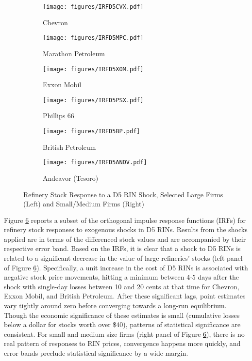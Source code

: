 \documentclass[11pt]{article}
\begin{document}
\begin{figure}[!htpb]
	\centering
	\begin{subfigure}{.5\textwidth}
		\centering
		\texttt{[image: figures/IRFD5CVX.pdf]}
		\caption{Chevron}
		\label{fig:sub1}
	\end{subfigure}%
	\begin{subfigure}{.5\textwidth}
		\centering
		\texttt{[image: figures/IRFD5MPC.pdf]}
		\caption{Marathon Petroleum}
		\label{fig:sub2}
	\end{subfigure}
	\begin{subfigure}{.5\textwidth}
		\centering
		\texttt{[image: figures/IRFD5XOM.pdf]}
		\caption{Exxon Mobil}
	\end{subfigure}%
	\begin{subfigure}{.5\textwidth}
		\centering
		\texttt{[image: figures/IRFD5PSX.pdf]}
		\caption{Phillips 66}
		\label{fig:sub2}
	\end{subfigure}
	\begin{subfigure}{.5\textwidth}
		\centering
		\texttt{[image: figures/IRFD5BP.pdf]}
		\caption{British Petroleum}
		\label{fig:sub1}
	\end{subfigure}%
	\begin{subfigure}{.5\textwidth}
		\centering
		\texttt{[image: figures/IRFD5ANDV.pdf]}
		\caption{Andeavor (Tesoro)}
		\label{fig:sub2}
	\end{subfigure}
	\caption{Refinery Stock Response to a D5 RIN Shock, Selected Large Firms (Left) and Small/Medium Firms (Right)}
	\label{fig:test}
\end{figure}

Figure \ref{fig:test} reports a subset of the orthogonal impulse response functions (IRFs) for refinery stock responses to exogenous shocks in D5 RINs. Results from the shocks applied are in terms of the differenced stock values and are accompanied by their respective error band. Based on the IRFs, it is clear that a shock to D5 RINs is related to a significant decrease in the value of large refineries' stocks (left panel of Figure \ref{fig:test}). Specifically, a unit increase in the cost of D5 RINs is associated with negative stock price movements, hitting a minimum between 4-5 days after the shock with single-day losses between 10 and 20 cents at that time for Chevron, Exxon Mobil, and British Petroleum. After these significant lags, point estimates vary tightly around zero before converging towards a long-run equilibrium. Though the economic significance of these estimates is small (cumulative losses below a dollar for stocks worth over \$40), patterns of statistical significance are consistent. For small and medium size firms (right panel of Figure \ref{fig:test}), there is no real pattern of responses to RIN prices, convergence happens more quickly, and error bands preclude statistical significance by a wide margin. 
\end{document}
